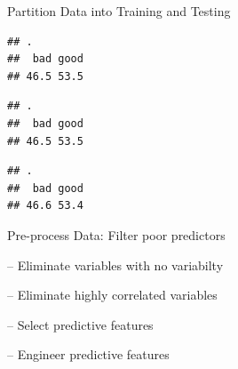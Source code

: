 \documentclass[ignorenonframetext,]{beamer}
\newenvironment{Shaded}{\begin{snugshade}}{\end{snugshade}}
\newcommand{\KeywordTok}[1]{\textcolor[rgb]{0.13,0.29,0.53}{\textbf{#1}}}
\newcommand{\DecValTok}[1]{\textcolor[rgb]{0.00,0.00,0.81}{#1}}
\newcommand{\StringTok}[1]{\textcolor[rgb]{0.31,0.60,0.02}{#1}}
\newcommand{\OperatorTok}[1]{\textcolor[rgb]{0.81,0.36,0.00}{\textbf{#1}}}
\newcommand{\NormalTok}[1]{#1}
\begin{document}
\begin{frame}[fragile]{Partition Data into Training and Testing}

\begin{Shaded}
\end{Shaded}

\begin{verbatim}
## .
##  bad good 
## 46.5 53.5
\end{verbatim}

\begin{Shaded}
\end{Shaded}

\begin{verbatim}
## .
##  bad good 
## 46.5 53.5
\end{verbatim}

\begin{Shaded}
\end{Shaded}

\begin{verbatim}
## .
##  bad good 
## 46.6 53.4
\end{verbatim}

\end{frame}

\begin{frame}{Pre-process Data: Filter poor predictors}

-- Eliminate variables with no variabilty

-- Eliminate highly correlated variables

-- Select predictive features

-- Engineer predictive features

\end{frame}
\end{document}
